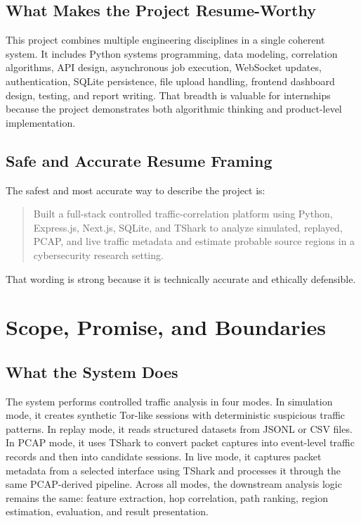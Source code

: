 \documentclass[12pt,a4paper]{report}
\begin{document}
\section{What Makes the Project Resume-Worthy}
This project combines multiple engineering disciplines in a single coherent system. It includes Python systems programming, data modeling, correlation algorithms, API design, asynchronous job execution, WebSocket updates, authentication, SQLite persistence, file upload handling, frontend dashboard design, testing, and report writing. That breadth is valuable for internships because the project demonstrates both algorithmic thinking and product-level implementation.

\section{Safe and Accurate Resume Framing}
The safest and most accurate way to describe the project is:
\begin{quote}
Built a full-stack controlled traffic-correlation platform using Python, Express.js, Next.js, SQLite, and TShark to analyze simulated, replayed, PCAP, and live traffic metadata and estimate probable source regions in a cybersecurity research setting.
\end{quote}

That wording is strong because it is technically accurate and ethically defensible.

\chapter{Scope, Promise, and Boundaries}
\section{What the System Does}
The system performs controlled traffic analysis in four modes. In simulation mode, it creates synthetic Tor-like sessions with deterministic suspicious traffic patterns. In replay mode, it reads structured datasets from JSONL or CSV files. In PCAP mode, it uses TShark to convert packet captures into event-level traffic records and then into candidate sessions. In live mode, it captures packet metadata from a selected interface using TShark and processes it through the same PCAP-derived pipeline. Across all modes, the downstream analysis logic remains the same: feature extraction, hop correlation, path ranking, region estimation, evaluation, and result presentation.
\end{document}
